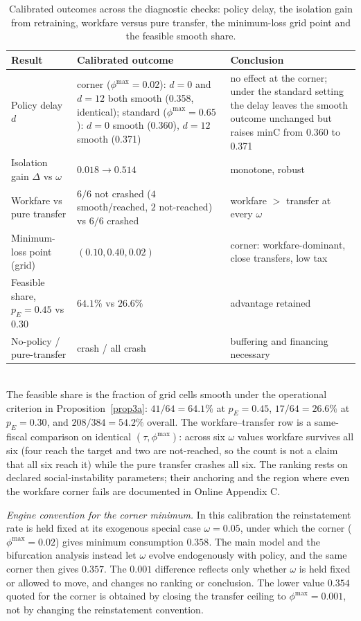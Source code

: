 \documentclass[review,12pt]{elsarticle}
\theoremstyle{plain}
\theoremstyle{definition}
\theoremstyle{remark}
\begin{document}
\begin{table}[htbp]
\centering
\small
\caption{Calibrated outcomes across the diagnostic checks: policy delay, the isolation gain from retraining, workfare versus pure transfer, the minimum-loss grid point and the feasible smooth share.}\label{tab:calibrated-outcomes}
\begin{tabular}{@{}
>{\raggedright\arraybackslash}p{1.55in}
>{\raggedright\arraybackslash}p{2.15in}
>{\raggedright\arraybackslash}p{2.45in}@{}}
\toprule
Result & Calibrated outcome & Conclusion \\
\midrule
Policy delay $d$ & corner ($\phi^{\max}{=}0.02$): $d{=}0$ and $d{=}12$ both smooth (0.358, identical); standard ($\phi^{\max}{=}0.65$): $d{=}0$ smooth (0.360), $d{=}12$ smooth (0.371) & no effect at the corner; under the standard setting the delay leaves the smooth outcome unchanged but raises minC from 0.360 to 0.371 \\
Isolation gain $\Delta$ vs $\omega$ & $0.018\to0.514$ & monotone, robust \\
Workfare vs pure transfer & $6/6$ not crashed ($4$ smooth/reached, $2$ not-reached) vs $6/6$ crashed & workfare $>$ transfer at every $\omega$ \\
Minimum-loss point (grid) & $(0.10,0.40,0.02)$ & corner: workfare-dominant, close transfers, low tax \\
Feasible share, $p_E{=}0.45$ vs $0.30$ & $64.1\%$ vs $26.6\%$ & advantage retained \\
No-policy / pure-transfer & crash / all crash & buffering and financing necessary \\
\bottomrule
\end{tabular}
\\[2pt]
\footnotesize The feasible share is the fraction of grid cells smooth under the operational criterion in Proposition~\ref{prop3a}: $41/64=64.1\%$ at $p_E=0.45$, $17/64=26.6\%$ at $p_E=0.30$, and $208/384=54.2\%$ overall. The workfare--transfer row is a same-fiscal comparison on identical $(\tau,\phi^{\max})$: across six $\omega$ values workfare survives all six (four reach the target and two are not-reached, so the count is not a claim that all six reach it) while the pure transfer crashes all six. The ranking rests on declared social-instability parameters; their anchoring and the region where even the workfare corner fails are documented in Online Appendix C.
\end{table}

\noindent\emph{Engine convention for the corner minimum.} In this calibration the reinstatement rate is held fixed at its exogenous special case $\omega=0.05$, under which the corner ($\phi^{\max}=0.02$) gives minimum consumption $0.358$. The main model and the bifurcation analysis instead let $\omega$ evolve endogenously with policy, and the same corner then gives $0.357$. The $0.001$ difference reflects only whether $\omega$ is held fixed or allowed to move, and changes no ranking or conclusion. The lower value $0.354$ quoted for the corner is obtained by closing the transfer ceiling to $\phi^{\max}=0.001$, not by changing the reinstatement convention.
\end{document}
